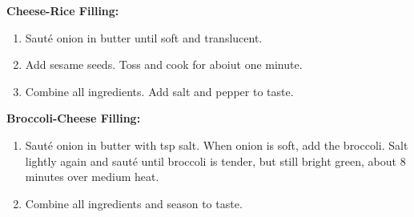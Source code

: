 

\textbf{Cheese-Rice Filling:}

\begin{ingredients}
\end{ingredients}


\begin{recipe}
  \begin{enumerate}

  \item Saut\'e onion in butter until soft and translucent.

  \item Add sesame seeds.  Toss and cook for aboiut one minute.

  \item Combine all ingredients.  Add salt and pepper to taste.

  \end{enumerate}
\end{recipe}



\textbf{Broccoli-Cheese Filling:}

\begin{ingredients}
\end{ingredients}


\begin{recipe}
  \begin{enumerate}

  \item Saut\'e onion in butter with \fracH tsp salt.  When onion is
    soft, add the broccoli.  Salt lightly again and saut\'e until
    broccoli is tender, but still bright green, about 8 minutes over
    medium heat.

  \item Combine all ingredients and season to taste.

  \end{enumerate}
\end{recipe}




